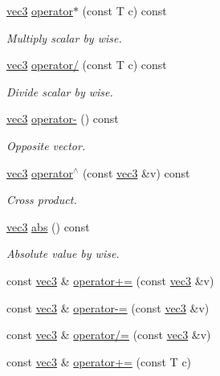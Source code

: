 \begin{DoxyCompactItemize}
\mbox{\hyperlink{structvec3}{vec3}} \mbox{\hyperlink{structvec3_a769b2eeb0c298c38d62cf06ea50534d7}{operator$\ast$}} (const T c) const
\begin{DoxyCompactList}\small\item\em Multiply scalar by wise. \end{DoxyCompactList}\item 
\mbox{\hyperlink{structvec3}{vec3}} \mbox{\hyperlink{structvec3_a1a47d6847627b552a0c642b356985297}{operator/}} (const T c) const
\begin{DoxyCompactList}\small\item\em Divide scalar by wise. \end{DoxyCompactList}\item 
\mbox{\hyperlink{structvec3}{vec3}} \mbox{\hyperlink{structvec3_a9ee0d5d83bd70141b9424928d0ea9c98}{operator-\/}} () const
\begin{DoxyCompactList}\small\item\em Opposite vector. \end{DoxyCompactList}\item 
\mbox{\hyperlink{structvec3}{vec3}} \mbox{\hyperlink{structvec3_a6469fdfd7c378f5f30e299bc2e1e776a}{operator$^\wedge$}} (const \mbox{\hyperlink{structvec3}{vec3}} \&v) const
\begin{DoxyCompactList}\small\item\em Cross product. \end{DoxyCompactList}\item 
\mbox{\hyperlink{structvec3}{vec3}} \mbox{\hyperlink{structvec3_abf0d30ac0a81beeacd36ddc86ec6ee83}{abs}} () const
\begin{DoxyCompactList}\small\item\em Absolute value by wise. \end{DoxyCompactList}\item 
const \mbox{\hyperlink{structvec3}{vec3}} \& \mbox{\hyperlink{structvec3_a5d12f7aba42eea6253a4ada5ce73b7d8}{operator+=}} (const \mbox{\hyperlink{structvec3}{vec3}} \&v)
\item 
const \mbox{\hyperlink{structvec3}{vec3}} \& \mbox{\hyperlink{structvec3_a6302bef90ffb5d572b9d452d902266c5}{operator-\/=}} (const \mbox{\hyperlink{structvec3}{vec3}} \&v)
\item 
const \mbox{\hyperlink{structvec3}{vec3}} \& \mbox{\hyperlink{structvec3_a4e52fc3e08391056d0e6e01a0375c395}{operator/=}} (const \mbox{\hyperlink{structvec3}{vec3}} \&v)
\item 
const \mbox{\hyperlink{structvec3}{vec3}} \& \mbox{\hyperlink{structvec3_ad87cc5752847a9ad05adba9c3d881324}{operator+=}} (const T c)

\end{DoxyCompactItemize}
